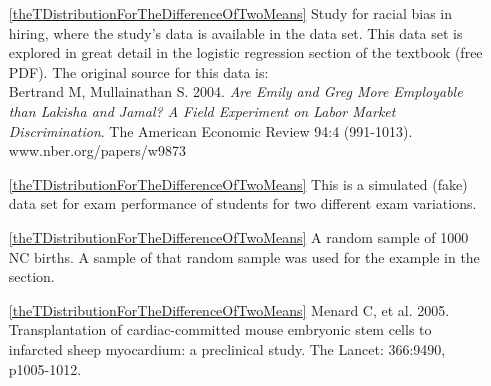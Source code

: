 \begin{itemize}
\item[\ref{theTDistributionForTheDifferenceOfTwoMeans}]
    Study for racial bias in hiring, where the study's data is available
    in the  data set.
    This data set is explored in great detail in the logistic regression
    section of the  textbook
    (free PDF).
    The original source for this data is:\\
    Bertrand M, Mullainathan S. 2004.
    \emph{Are Emily and Greg More Employable than Lakisha and Jamal?
    A Field Experiment on Labor Market Discrimination}.
    The American Economic Review 94:4 (991-1013).
        {www.nber.org/papers/w9873}

\item[\ref{theTDistributionForTheDifferenceOfTwoMeans}]
    This is a simulated (fake) data set for exam performance
    of students for two different exam variations.

\item[\ref{theTDistributionForTheDifferenceOfTwoMeans}]
    A random sample of 1000 NC births.
    A sample of that random sample was used for the example
    in the section.

\item[\ref{theTDistributionForTheDifferenceOfTwoMeans}]
        {Menard C, et al. 2005.
            Transplantation of cardiac-committed mouse embryonic
            stem cells to infarcted sheep myocardium:
            a preclinical study.
            The Lancet: 366:9490, p1005-1012.}

\end{itemize}




\D{\newpage}


